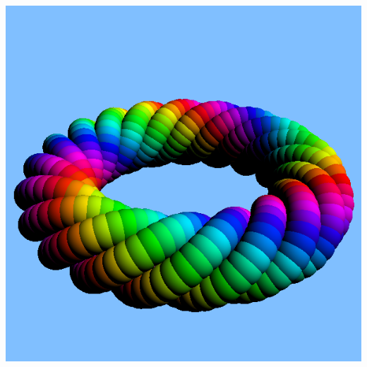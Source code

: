 \documentclass{article}
\begin{document}
\begin{description}
\begin{center}
      {\includegraphics[scale=0.5]{ring02.png}}

\end{center}


\end{description}
\end{document}

